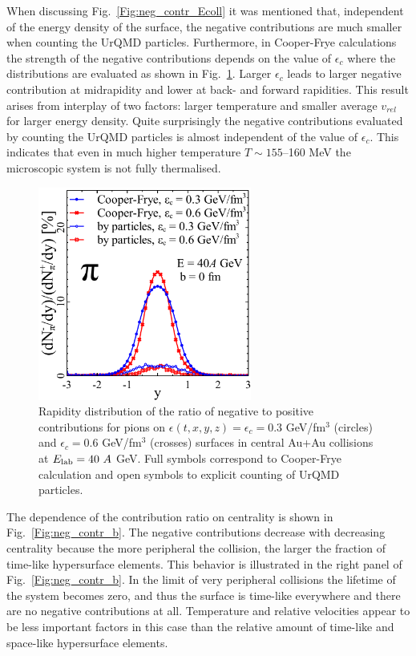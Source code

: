 When discussing Fig.~\ref{Fig:neg_contr_Ecoll} it was mentioned that,
independent of the energy density of the surface, the negative
contributions are much smaller when counting the UrQMD
particles. Furthermore, in Cooper-Frye calculations the strength of
the negative contributions depends on the value of $\epsilon_c$ where
the distributions are evaluated as shown in
Fig.~\ref{Fig:neg_contr_e0}. Larger $\epsilon_c$ leads to larger
negative contribution at midrapidity and lower at back- and forward
rapidities. This result arises from interplay of two factors: larger
temperature and smaller average $v_{rel}$ for larger energy
density. Quite surprisingly the negative contributions evaluated by
counting the UrQMD particles is almost independent of the value of
$\epsilon_c$. This indicates that even in much higher temperature
$T\sim 155$--160 MeV the microscopic system is not fully thermalised.

\begin{figure}[htp]
\includegraphics[width=7cm]{plots/cooper_frye/piym_new.pdf}
\caption{ Rapidity distribution of the ratio of negative
  to positive contributions for pions on
  $\epsilon(t,x,y,z) = \epsilon_c = 0.3$ GeV/fm$^3$ (circles) and
  $\epsilon_c = 0.6$ GeV/fm$^3$ (crosses) surfaces in central Au+Au
  collisions at $E_\mathrm{lab} = 40\ A$ GeV. Full symbols correspond to
  Cooper-Frye calculation and open symbols to explicit counting of
  UrQMD particles.}
\label{Fig:neg_contr_e0}
\end{figure}

The dependence of the contribution ratio on centrality is shown in
Fig.~\ref{Fig:neg_contr_b}. The negative contributions decrease with
decreasing centrality because the more peripheral the collision, the
larger the fraction of time-like hypersurface elements. This behavior
is illustrated in the right panel of Fig.~\ref{Fig:neg_contr_b}. In
the limit of very peripheral collisions the lifetime of the system
becomes zero, and thus the surface is time-like everywhere and there
are no negative contributions at all. Temperature and relative
velocities appear to be less important factors in this case than the
relative amount of time-like and space-like hypersurface elements.

